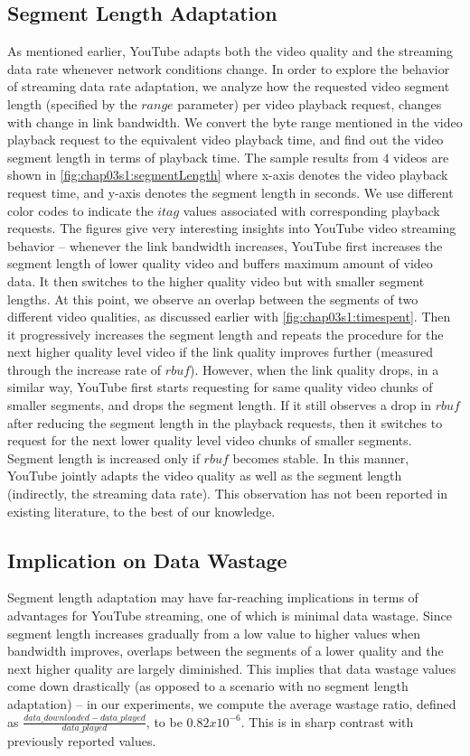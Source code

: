 \subsection{Segment Length Adaptation} 
As mentioned earlier, YouTube adapts both the video quality and the streaming data rate whenever network conditions change.
In order to explore the behavior of streaming data rate adaptation, we analyze how the requested video segment length (specified by the $range$ parameter) per video playback request, changes with change in link bandwidth.
We convert the byte range mentioned in the video playback request to the equivalent video playback time, and find out the video segment length in terms of playback time.
The sample results from $4$ videos are shown in \fig\ref{fig:chap03s1:segmentLength} where x-axis denotes the video playback request time, and y-axis denotes the segment length in seconds.
We use different color codes to indicate the $itag$ values associated with corresponding playback requests.
The figures give very interesting insights into YouTube video streaming behavior -- whenever the link bandwidth increases, YouTube first increases the segment length of lower quality video and buffers maximum amount of video data.
It then switches to the higher quality video but with smaller segment lengths.
At this point, we observe an overlap between the segments of two different video qualities, as discussed earlier with \fig\ref{fig:chap03s1:timespent}.
Then it progressively increases the segment length and repeats the procedure for the next higher quality level video if the link quality improves further (measured through the increase rate of $rbuf$).
However, when the link quality drops, in a similar way, YouTube first starts requesting for same quality video chunks of smaller segments, and drops the segment length.
If it still observes a drop in $rbuf$ after reducing the segment length in the playback requests, then it switches to request for the next lower quality level video chunks of smaller segments.
Segment length is increased only if $rbuf$ becomes stable.
In this manner, YouTube jointly adapts the video quality as well as the segment length (indirectly, the streaming data rate).
This observation has not been reported in existing literature, to the best of our knowledge.

\subsection{Implication on Data Wastage} 
Segment length adaptation may have far-reaching implications in terms of advantages for YouTube streaming, one of which is minimal data wastage.
Since segment length increases gradually from a low value to higher values when bandwidth improves, overlaps between the segments of a lower quality and the next higher quality are largely diminished.
This implies that data wastage values come down drastically (as opposed to a scenario with no segment length adaptation) -- in our experiments, we compute the average wastage ratio, defined as $\frac{data\_downloaded - data\_played}{data\_played}$, to be $0.82 x 10^{-6}$.
This is in sharp contrast with previously reported values. 

